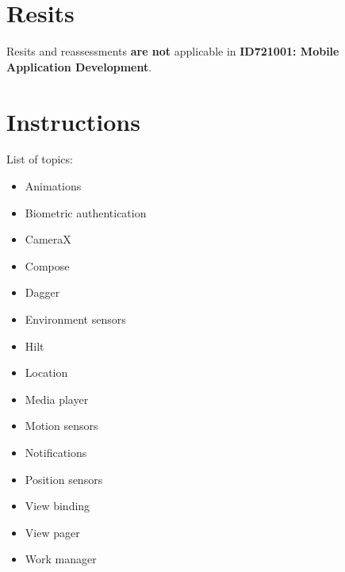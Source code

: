 \documentclass{article}
\begin{document}
\section*{Resits}
Resits and reassessments \textbf{are not} applicable in \textbf{ID721001: Mobile Application Development}.

\section*{Instructions}

List of topics:

\begin{itemize}
	\item Animations
	\item Biometric authentication
	\item CameraX
	\item Compose
	\item Dagger
	\item Environment sensors
	\item Hilt
	\item Location
	\item Media player
	\item Motion sensors
	\item Notifications
	\item Position sensors
	\item View binding
	\item View pager
	\item Work manager
\end{itemize}
\end{document}
